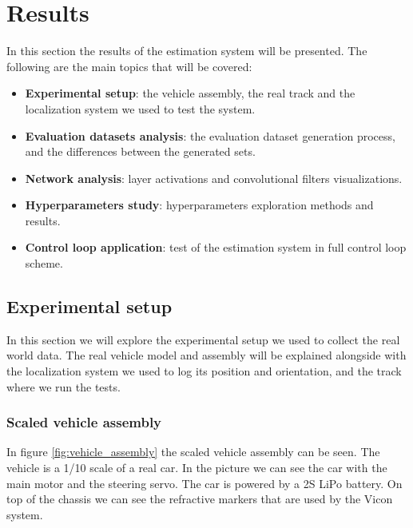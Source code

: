\documentclass[a4paper,12pt,sort&compress]{article}
\begin{document}
\pagebreak

\section{Results} \label{sec:results}
    In this section the results of the estimation system will be presented. The following are the
    main topics that will be covered:
    \begin{itemize}
        \item \textbf{Experimental setup}: the vehicle assembly, the real track and the localization
        system we used to test the system.
        \item \textbf{Evaluation datasets analysis}: the evaluation dataset generation process, and the
        differences between the generated sets.
        \item \textbf{Network analysis}: layer activations and convolutional filters visualizations.
        \item \textbf{Hyperparameters study}: hyperparameters exploration methods and results.
        \item \textbf{Control loop application}: test of the estimation system in full control loop scheme.
    \end{itemize}

\pagebreak


\subsection{Experimental setup} \label{sec:exp_setup}
    In this section we will explore the experimental setup we used to collect the real world data.
    The real vehicle model and assembly will be explained alongside with the localization system we
    used to log its position and orientation, and the track where we run the tests.

\subsubsection*{Scaled vehicle assembly}

    In figure \ref{fig:vehicle_assembly} the scaled vehicle assembly can be seen. The vehicle is a 1/10 scale
    of a real car. In the picture we can see the car with the main motor and the steering servo. The
    car is powered by a 2S LiPo battery. On top of the chassis we can see the refractive markers
    that are used by the Vicon system.  
\end{document}
